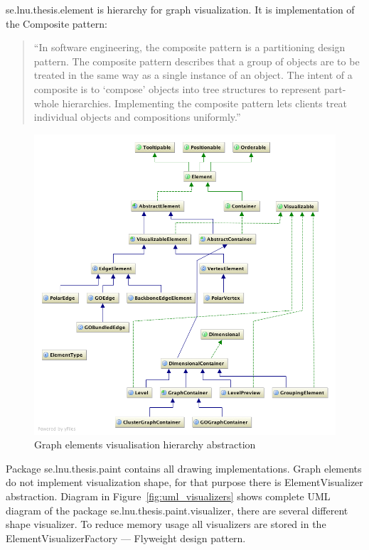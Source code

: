 \textsf{se.lnu.thesis.element} is hierarchy for graph visualization. It is implementation of the Composite pattern:

\begin{quotation}
``In software engineering, the composite pattern is a partitioning design pattern.
The composite pattern describes that a group of objects are to be treated in the same way as a single instance of an object.
The intent of a composite is to `compose' objects into tree structures to represent part-whole hierarchies.
Implementing the composite pattern lets clients treat individual objects and compositions uniformly.''~\cite{COMPOSITE_GAMMA}
\end{quotation}

\begin{figure}[h!]
\centering
\includegraphics[scale=0.42]{pictures/uml_elements.png}
\caption{Graph elements visualisation hierarchy abstraction}
\label{fig:uml_elements}
\end{figure}

Package \textsf{se.lnu.thesis.paint} contains all drawing implementations.
Graph elements do not implement visualization shape, for that purpose there is \textsf{ElementVisualizer} abstraction. Diagram in Figure~\ref{fig:uml_visualizers} shows complete UML diagram of the package \textsf{se.lnu.thesis.paint.visualizer}, there are several different shape visualizer. To reduce memory usage all visualizers are stored in the \textsf{ElementVisualizerFactory} --- Flyweight design pattern.

